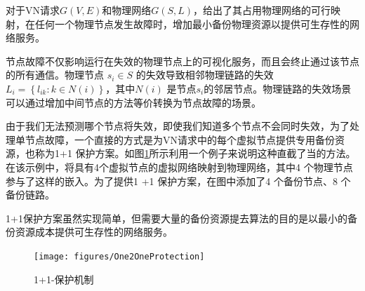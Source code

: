 对于VN请求$G (V,E)$和物理网络$G (S,L)$，给出了其占用物理网络的可行映射，在任何一个物理节点发生故障时，增加最小备份物理资源以提供可生存性的网络服务。

节点故障不仅影响运行在失效的物理节点上的可视化服务，而且会终止通过该节点的所有通信。物理节点 $ {s_i} \in S $ 的失效导致相邻物理链路的失效${L_i} = \left\{ {{l_{ik}}:k \in N(i)} \right\}$，其中${N(i)}$ 是节点$ {s_i} $的邻居节点。物理链路的失效场景可以通过增加中间节点的方法等价转换为节点故障的场景。

由于我们无法预测哪个节点将失效，即使我们知道多个节点不会同时失效，为了处理单节点故障，一个直接的方式是为VN请求中的每个虚拟节点提供专用备份资源，也称为1+1 保护方案。如图\ref{fig:One2OneProtection}所示利用一个例子来说明这种直截了当的方法。在该示例中，将具有4个虚拟节点的虚拟网络映射到物理网络，其中4 个物理节点参与了这样的嵌入。为了提供1 +1 保护方案，在图中添加了4 个备份节点、8 个备份链路。

1+1保护方案虽然实现简单，但需要大量的备份资源提去算法的目的是以最小的备份资源成本提供可生存性的网络服务。

\begin{figure}[htbp]
\centering
\texttt{[image: figures/One2OneProtection]}\\
\caption{1+1-保护机制}\label{fig:One2OneProtection}
\end{figure}


